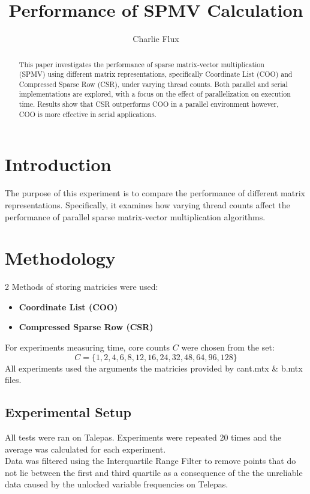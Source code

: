 \documentclass[conference]{IEEEtran}
\title{Performance of SPMV Calculation}
\author{Charlie Flux}
\begin{document}
\maketitle

\begin{abstract}
This paper investigates the performance of sparse matrix-vector multiplication (SPMV) using different matrix representations, specifically Coordinate List (COO) and Compressed Sparse Row (CSR), under varying thread counts.
Both parallel and serial implementations are explored, with a focus on the effect of parallelization on execution time.
Results show that CSR outperforms COO in a parallel environment however, COO is more effective in serial applications.
\end{abstract}

\section{Introduction}
The purpose of this experiment is to compare the performance of different matrix representations. Specifically, it examines how varying thread counts affect the performance of parallel sparse matrix-vector multiplication algorithms.
\section{Methodology}
2 Methods of storing matricies were used:
\begin{itemize}
    \item \textbf{Coordinate List (COO)}
    \item \textbf{Compressed Sparse Row (CSR)} 
\end{itemize}

For experiments measuring time, core counts \(C\) were chosen from the set:
    \[
    C = \{1, 2, 4, 6, 8, 12, 16, 24, 32, 48, 64, 96, 128\}
    \]
All experiments used the arguments the matricies provided by cant.mtx \& b.mtx files.
\subsection{Experimental Setup}
All tests were ran on Talepas. Experiments were repeated 20 times and the average was calculated for each experiment. \\
Data was filtered using the Interquartile Range Filter to remove points that do not lie between the first and third quartile as a consequence of the the unreliable data caused by the unlocked variable frequencies on Telepas.
\end{document}
